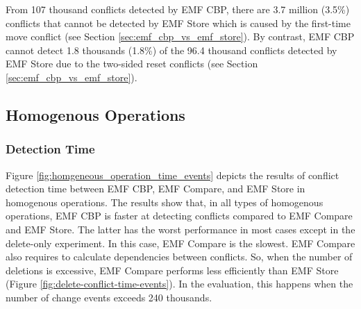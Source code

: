 From 107 thousand conflicts detected by EMF CBP, there are 3.7 million (3.5\%) conflicts that cannot be detected by EMF Store which is caused by the first-time move conflict (see Section \ref{sec:emf_cbp_vs_emf_store}). By contrast, EMF CBP cannot detect 1.8 thousands (1.8\%) of the 96.4 thousand conflicts detected by EMF Store due to the two-sided reset conflicts (see Section \ref{sec:emf_cbp_vs_emf_store}). 



%
%
%

\subsection{Homogenous Operations}
\label{sec:homogenous-operation_conflict}

\subsubsection{Detection Time} 
\label{sec:detection_time}
Figure \ref{fig:homgeneous_operation_time_events} depicts the results of conflict detection time between EMF CBP, EMF Compare, and EMF Store in homogenous operations. The results show that, in all types of homogenous operations, EMF CBP is faster at detecting conflicts compared to EMF Compare and EMF Store. The latter has the worst performance in most cases except in the delete-only experiment. In this case, EMF Compare is the slowest. EMF Compare also requires to calculate dependencies between conflicts. So, when the number of deletions is excessive, EMF Compare performs less efficiently than EMF Store (Figure \ref{fig:delete-conflict-time-events}). In the evaluation, this happens when the number of change events exceeds 240 thousands.

